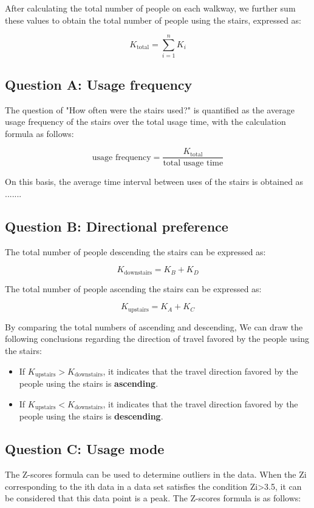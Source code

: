 \documentclass{mcmthesis}
\begin{document}
After calculating the total number of people on each walkway, we further sum these values to obtain the total number of people using the stairs, expressed as:

\[ K_{\text{total}} = \sum_{i=1}^n K_i \]


\subsection{Question A: Usage frequency}

The question of "How often were the stairs used?" is quantified as the average usage frequency of the stairs over the total usage time, with the calculation formula as follows:

\[ \text{usage frequency} = \frac{K_{\text{total}}}{\text{total usage time}} \]

On this basis, the average time interval between uses of the stairs is obtained as .......

\subsection{Question B: Directional preference}

The total number of people descending the stairs can be expressed as:

\[ K_{\text{downstairs}} = K_B + K_D \]

The total number of people ascending the stairs can be expressed as:

\[ K_{\text{upstairs}} = K_A + K_C \]

By comparing the total numbers of ascending and descending, We can draw the following conclusions regarding the direction of travel favored by the people using the stairs:

\begin{itemize} 

\item If $K_{\text{upstairs}}>K_{\text{downstairs}}$, it indicates that the travel direction favored by the people using the stairs is \textbf{ascending}. %

\item If $K_{\text{upstairs}}<K_{\text{downstairs}}$, it indicates that the travel direction favored by the people using the stairs is \textbf{descending}. %

\end{itemize}


\subsection{Question C: Usage mode}
The Z-scores formula can be used to determine outliers in the data. When the Zi corresponding to the ith data in a data set satisfies the condition Zi>3.5\cite{curtis2016mystery},  it can be considered that this data point is a peak. The Z-scores formula is as follows:
\end{document}
